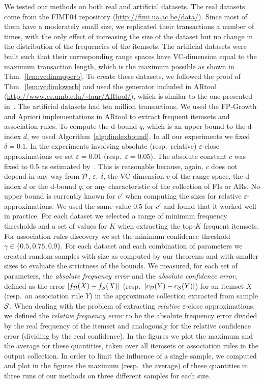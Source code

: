 We tested our methods on both real and artificial datasets. The real datasets
come from the FIMI'04 repository (\url{http://fimi.ua.ac.be/data/}). Since most
of them have a moderately small size, we replicated their transactions a number
of times, with the only effect of increasing the size of the dataset but no
change in the distribution of the frequencies of the itemsets. The artificial
datasets were built such that their corresponding range spaces
have VC-dimension equal to the maximum transaction length, which is the
maximum possible as shown in Thm.~\ref{lem:vcdimupperb}. To create these
datasets, we followed the proof of Thm.~\ref{lem:vcdimlowerb} and used the
generator included in ARtool (\url{http://www.cs.umb.edu/~laur/ARtool/}), which
is similar to the one presented in~\citep{AgrawalS94}. The artificial datasets
had ten million transactions. We used the FP-Growth and
Apriori implementations in ARtool to extract frequent itemsets and association
rules. To compute the d-bound $q$, which is an upper bound to the d-index $d$,
we used Algorithm~\ref{alg:dindexbound}.
In all our experiments we fixed $\delta=0.1$. In the experiments involving
absolute (resp.~relative) $\varepsilon$-close approximations we set
$\varepsilon=0.01$ (resp.~$\varepsilon=0.05$). The absolute constant $c$ was fixed to
$0.5$ as %
estimated by~\citep{LofflerP09}. This is reasonable because, again, $c$
does not depend in any way from ${\cal D}$, $\varepsilon$, $\delta$, the VC-dimension
$v$ of the range space, the d-index $d$ or the d-bound $q$, or any
characteristic of the collection of FIs or ARs. No upper bound is currently
known for $c'$ when computing the sizes for relative
$\varepsilon$-approximations. We used the same value $0.5$ for $c'$ and
found that it worked well in practice. For each dataset we selected a
range of minimum frequency thresholds and a set of values for $K$ when
extracting the top-$K$ frequent itemsets. For association rules discovery we set
the minimum confidence threshold $\gamma\in\{0.5, 0.75, 0.9\}$. For each
dataset and each combination of parameters we created random samples with size
as computed by our theorems and with smaller sizes to evaluate the strictness
of the bounds.  
We measured, for each set of parameters, the \emph{absolute
frequency error} and the \emph{absolute confidence error}, defined 
as  the error
$|f_{\cal D}(X)-f_{\cal S}(X)|$ (resp.~$|c_{\cal D}(Y)-c_{\cal S}(Y)|$) for an itemset $X$
(resp.~an association rule $Y$) in the approximate collection extracted from sample ${\cal S}$.
When dealing with the
problem of extracting \emph{relative} $\varepsilon$-close approximations, we
defined the \emph{relative frequency error} to be the absolute
frequency error divided by the real frequency of the itemset and analogously for
the relative confidence error (dividing by the real confidence). In the figures
we plot the maximum and the average for these quantities, taken over all
itemsets or association rules in the output collection. In order to limit the
influence of a single sample, we computed and plot in the figures the maximum
(resp.~the average) of these quantities in three runs of our methods on three
different samples for each size.


